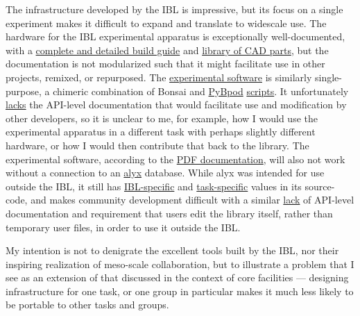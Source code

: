 \documentclass[notoc]{tufte-book}
\begin{document}
The infrastructure developed by the IBL is impressive, but its focus on
a single experiment makes it difficult to expand and translate to
widescale use. The hardware for the IBL experimental apparatus is
exceptionally well-documented, with a
\href{https://figshare.com/articles/preprint/A_standardized_and_reproducible_method_to_measure_decision-making_in_mice_Appendix_3_IBL_protocol_for_setting_up_the_behavioral_training_rig/11634732}{complete
and detailed build guide} and
\href{https://figshare.com/articles/online_resource/A_standardized_and_reproducible_method_to_measure_decision-making_in_mice_CAD_files_for_behavior_rig/11639973}{library
of CAD parts}, but the documentation is not modularized such that it
might facilitate use in other projects, remixed, or repurposed. The
\href{https://github.com/int-brain-lab/iblrig}{experimental software} is
similarly single-purpose, a chimeric combination of Bonsai \citep{lopesBonsaiEventbasedFramework2015}  and
\href{https://github.com/pybpod/pybpod}{PyBpod}
\href{https://github.com/int-brain-lab/iblrig/tree/master/tasks/_iblrig_tasks_ephysChoiceWorld}{scripts}.
It unfortunately
\href{https://iblrig.readthedocs.io/en/latest/index.html}{lacks} the
API-level documentation that would facilitate use and modification by
other developers, so it is unclear to me, for example, how I would use
the experimental apparatus in a different task with perhaps slightly
different hardware, or how I would then contribute that back to the
library. The experimental software, according to the
\href{https://figshare.com/articles/preprint/A_standardized_and_reproducible_method_to_measure_decision-making_in_mice_Appendix_3_IBL_protocol_for_setting_up_the_behavioral_training_rig/11634732}{PDF
documentation}, will also not work without a connection to an
\href{https://github.com/cortex-lab/alyx}{alyx} database. While alyx was
intended for use outside the IBL, it still has
\href{https://github.com/cortex-lab/alyx/blob/07f481f6bbde668b81ad2634f4c42df4d6a74e44/alyx/data/management/commands/files.py\#L188}{IBL-specific}
and
\href{https://github.com/cortex-lab/alyx/blob/07f481f6bbde668b81ad2634f4c42df4d6a74e44/alyx/data/fixtures/data.datasettype.json\#L29}{task-specific}
values in its source-code, and makes community development difficult
with a similar \href{https://alyx.readthedocs.io/en/latest/}{lack} of
API-level documentation and requirement that users edit the library
itself, rather than temporary user files, in order to use it outside the
IBL.

My intention is not to denigrate the excellent tools built by the IBL,
nor their inspiring realization of meso-scale collaboration, but to
illustrate a problem that I see as an extension of that discussed in the
context of core facilities --- designing infrastructure for one task, or
one group in particular makes it much less likely to be portable to
other tasks and groups.
\end{document}
